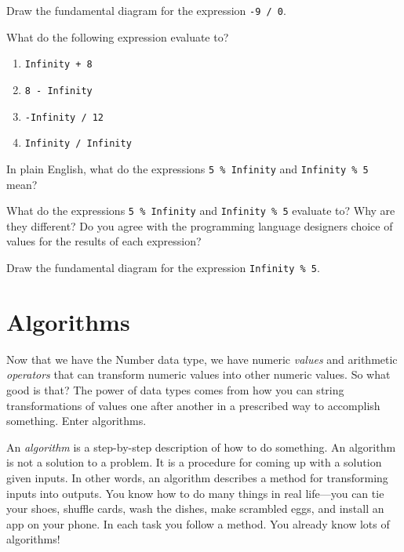 \begin{question}
  Draw the fundamental diagram for the expression \texttt{-9 / 0}.
\end{question}

\begin{question}
  What do the following expression evaluate to?
  \begin{enumerate}
    \item \texttt{Infinity + 8}
    \item \texttt{8 - Infinity}
    \item \texttt{-Infinity / 12}
    \item \texttt{Infinity / Infinity}
  \end{enumerate}
\end{question}

\begin{question}
In plain English, what do the expressions \texttt{5 \% Infinity} and
\texttt{Infinity \% 5} mean?
\end{question}

\begin{question}
What do the expressions \texttt{5 \% Infinity} and \texttt{Infinity \% 5}
evaluate to? Why are they different? Do you agree with the programming language
designers choice of values for the results of each expression?
\end{question}

\begin{question}
  Draw the fundamental diagram for the expression \texttt{Infinity \% 5}.
\end{question}


\section{Algorithms}

Now that we have the \textsf{Number} data type, we have numeric \emph{values}
and arithmetic \emph{operators} that can transform numeric values into other
numeric values. So what good is that? The power of data types comes from how you
can string transformations of values one after another in a prescribed way to
accomplish something. Enter algorithms.

An \emph{algorithm} is a step-by-step description of how to do something. An
algorithm is not a solution to a problem. It is a procedure for coming up with a
solution given inputs. In other words, an algorithm describes a method for
transforming inputs into outputs. You know how to do many things in real
life---you can tie your shoes, shuffle cards, wash the dishes, make scrambled
eggs, and install an app on your phone. In each task you follow a method. You
already know lots of algorithms!

